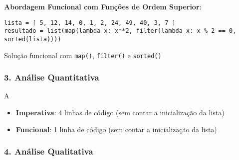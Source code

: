 \textbf{Abordagem Funcional com Funções de Ordem Superior}:

\begin{listing}[!ht]
\begin{verbatim}
lista = [ 5, 12, 14, 0, 1, 2, 24, 49, 40, 3, 7 ]
resultado = list(map(lambda x: x**2, filter(lambda x: x % 2 == 0, sorted(lista))))
\end{verbatim}
\caption{Solução funcional com \texttt{map()}, \texttt{filter()} e \texttt{sorted()}}
\label{listing:hof_funcional}
\end{listing}

\subsubsection*{3. Análise Quantitativa}
A
\begin{itemize}
    \item \textbf{Imperativa}: 4 linhas de código (sem contar a inicialização da lista)
    \item \textbf{Funcional}: 1 linha de código (sem contar a inicialização da lista)
\end{itemize}

\subsubsection*{4. Análise Qualitativa}

